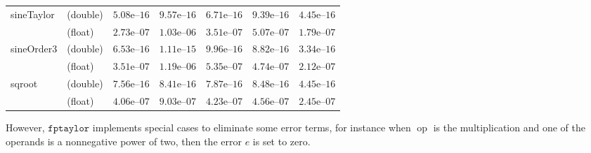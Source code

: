 \documentclass[a4paper,10pt]{article}
\DeclareMathOperator{\op}{op}
\newcommand{\fptaylor}{\mathtt{fptaylor}}
\theoremstyle{plain}
\theoremstyle{definition}
\theoremstyle{remark}
\begin{document}
\begin{table}[!ht]
\begin{center}
\begin{tabular}{p{2.3cm}lccccc}
\hline
\multirow{2}{*}{sineTaylor}
& (double) & $5.08\text{e--}16$ & $9.57\text{e--}16$ & $6.71\text{e--}16$ & $9.39\text{e--}16$ & $4.45\text{e--}16$\\
& (float) & $2.73\text{e--}07$ & $1.03\text{e--}06$ & $3.51\text{e--}07$ & $5.07\text{e--}07$ & $1.79\text{e--}07$\\
\hline
\multirow{2}{*}{sineOrder3}
& (double) & $6.53\text{e--}16$ & $1.11\text{e--}15$ & $9.96\text{e--}16$ & $8.82\text{e--}16$ & $3.34\text{e--}16$\\
& (float) & $3.51\text{e--}07$ & $1.19\text{e--}06$ & $5.35\text{e--}07$ & $4.74\text{e--}07$ & $2.12\text{e--}07$\\
\hline
\multirow{2}{*}{sqroot}
& (double) & $7.56\text{e--}16$ & $8.41\text{e--}16$ & $7.87\text{e--}16$ & $8.48\text{e--}16$ & $4.45\text{e--}16$\\
& (float) & $4.06\text{e--}07$ & $9.03\text{e--}07$ & $4.23\text{e--}07$ & $4.56\text{e--}07$ & $2.45\text{e--}07$\\
\hline
\end{tabular}
\label{table:error}
\end{center}
\end{table}


However, $\fptaylor$ implements special cases to eliminate some error terms, for instance when $\op$ is the multiplication and one of the operands is a nonnegative power of two, then the error $e$ is set to zero. 
\end{document}
